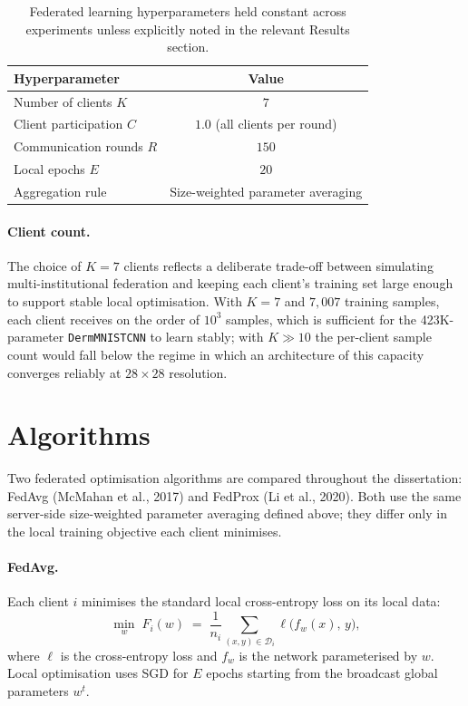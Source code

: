 \documentclass[11pt,a4paper]{report}
\begin{document}
\begin{table}[!htbp]
\centering
\caption{Federated learning hyperparameters held constant across
experiments unless explicitly noted in the relevant Results
section.}
\label{tab:fl-setup}
\small
\begin{tabular}{lc}
\toprule
Hyperparameter & Value \\
\midrule
Number of clients $K$                & $7$ \\
Client participation $C$             & $1.0$ (all clients per round) \\
Communication rounds $R$             & $150$ \\
Local epochs $E$                     & $20$ \\
Aggregation rule                     & Size-weighted parameter averaging \\
\bottomrule
\end{tabular}
\end{table}

\paragraph{Client count.}
The choice of $K = 7$ clients reflects a deliberate trade-off
between simulating multi-institutional federation and keeping
each client's training set large enough to support stable local
optimisation. With $K = 7$ and $7{,}007$ training samples, each
client receives on the order of $10^3$ samples, which is
sufficient for the 423K-parameter \texttt{DermMNISTCNN} to learn
stably; with $K \gg 10$ the per-client sample count would fall
below the regime in which an architecture of this capacity
converges reliably at $28\times28$ resolution.

\section{Algorithms}
\label{sec:methods-algorithms}

Two federated optimisation algorithms are compared throughout
the dissertation: FedAvg (McMahan et al., 2017) and FedProx
(Li et al., 2020). Both use the same server-side size-weighted
parameter averaging defined above; they differ only in the local
training objective each client minimises.

\paragraph{FedAvg.}
Each client $i$ minimises the standard local cross-entropy loss
on its local data:
\[
\min_{w} \; F_i(w) \;=\; \frac{1}{n_i} \sum_{(x, y) \in \mathcal{D}_i}
\ell\big(f_w(x),\, y\big),
\]
where $\ell$ is the cross-entropy loss and $f_w$ is the network
parameterised by $w$. Local optimisation uses SGD for $E$ epochs
starting from the broadcast global parameters $w^t$.
\end{document}

